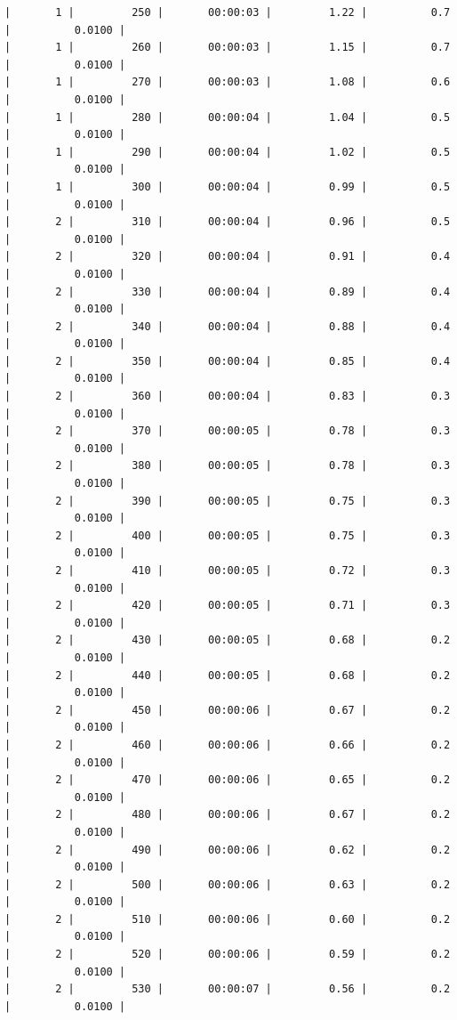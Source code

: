 \documentclass[11pt]{article}
\begin{document}
\begin{Verbatim}[commandchars=\\\{\}]
|       1 |         250 |       00:00:03 |         1.22 |          0.7 |          0.0100 |
|       1 |         260 |       00:00:03 |         1.15 |          0.7 |          0.0100 |
|       1 |         270 |       00:00:03 |         1.08 |          0.6 |          0.0100 |
|       1 |         280 |       00:00:04 |         1.04 |          0.5 |          0.0100 |
|       1 |         290 |       00:00:04 |         1.02 |          0.5 |          0.0100 |
|       1 |         300 |       00:00:04 |         0.99 |          0.5 |          0.0100 |
|       2 |         310 |       00:00:04 |         0.96 |          0.5 |          0.0100 |
|       2 |         320 |       00:00:04 |         0.91 |          0.4 |          0.0100 |
|       2 |         330 |       00:00:04 |         0.89 |          0.4 |          0.0100 |
|       2 |         340 |       00:00:04 |         0.88 |          0.4 |          0.0100 |
|       2 |         350 |       00:00:04 |         0.85 |          0.4 |          0.0100 |
|       2 |         360 |       00:00:04 |         0.83 |          0.3 |          0.0100 |
|       2 |         370 |       00:00:05 |         0.78 |          0.3 |          0.0100 |
|       2 |         380 |       00:00:05 |         0.78 |          0.3 |          0.0100 |
|       2 |         390 |       00:00:05 |         0.75 |          0.3 |          0.0100 |
|       2 |         400 |       00:00:05 |         0.75 |          0.3 |          0.0100 |
|       2 |         410 |       00:00:05 |         0.72 |          0.3 |          0.0100 |
|       2 |         420 |       00:00:05 |         0.71 |          0.3 |          0.0100 |
|       2 |         430 |       00:00:05 |         0.68 |          0.2 |          0.0100 |
|       2 |         440 |       00:00:05 |         0.68 |          0.2 |          0.0100 |
|       2 |         450 |       00:00:06 |         0.67 |          0.2 |          0.0100 |
|       2 |         460 |       00:00:06 |         0.66 |          0.2 |          0.0100 |
|       2 |         470 |       00:00:06 |         0.65 |          0.2 |          0.0100 |
|       2 |         480 |       00:00:06 |         0.67 |          0.2 |          0.0100 |
|       2 |         490 |       00:00:06 |         0.62 |          0.2 |          0.0100 |
|       2 |         500 |       00:00:06 |         0.63 |          0.2 |          0.0100 |
|       2 |         510 |       00:00:06 |         0.60 |          0.2 |          0.0100 |
|       2 |         520 |       00:00:06 |         0.59 |          0.2 |          0.0100 |
|       2 |         530 |       00:00:07 |         0.56 |          0.2 |          0.0100 |

\end{Verbatim}
\end{document}

